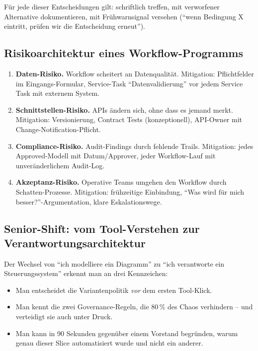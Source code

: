 \documentclass[11pt,a4paper,oneside]{article}
\begin{document}
Für jede dieser Entscheidungen gilt: schriftlich treffen, mit verworfener Alternative dokumentieren, mit Frühwarnsignal versehen (``wenn Bedingung X eintritt, prüfen wir die Entscheidung erneut'').

\subsection{Risikoarchitektur eines Workflow-Programms}

\begin{enumerate}
  \item \textbf{Daten-Risiko.} Workflow scheitert an Datenqualität. Mitigation: Pflichtfelder im Eingangs-Formular, Service-Task ``Datenvalidierung'' vor jedem Service Task mit externem System.
  \item \textbf{Schnittstellen-Risiko.} APIs ändern sich, ohne dass es jemand merkt. Mitigation: Versionierung, Contract Tests (konzeptionell), API-Owner mit Change-Notification-Pflicht.
  \item \textbf{Compliance-Risiko.} Audit-Findings durch fehlende Trails. Mitigation: jedes Approved-Modell mit Datum/Approver, jeder Workflow-Lauf mit unveränderlichem Audit-Log.
  \item \textbf{Akzeptanz-Risiko.} Operative Teams umgehen den Workflow durch Schatten-Prozesse. Mitigation: frühzeitige Einbindung, ``Was wird für mich besser?''-Argumentation, klare Eskalationswege.
\end{enumerate}

\subsection{Senior-Shift: vom Tool-Verstehen zur Verantwortungsarchitektur}

Der Wechsel von ``ich modelliere ein Diagramm'' zu ``ich verantworte ein Steuerungssystem'' erkennt man an drei Kennzeichen:

\begin{itemize}
  \item Man entscheidet die Variantenpolitik \emph{vor} dem ersten Tool-Klick.
  \item Man kennt die zwei Governance-Regeln, die 80\,\% des Chaos verhindern -- und verteidigt sie auch unter Druck.
  \item Man kann in 90 Sekunden gegenüber einem Vorstand begründen, warum genau dieser Slice automatisiert wurde und nicht ein anderer.
\end{itemize}
\end{document}
